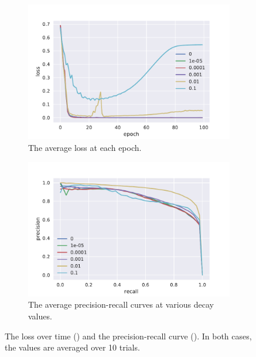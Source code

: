 \begin{figure}[htbp]
  \centering
  \begin{subfigure}[t]{0.49\textwidth}
    \centering
    \includegraphics[width=\textwidth]{./figures/results/decay/losses.pdf}
    \caption{The average loss at each epoch.\\}%
    \label{fig:decay_loss}
  \end{subfigure}
  \begin{subfigure}[t]{0.49\textwidth}
    \centering
    \includegraphics[width=\textwidth]{./figures/results/decay/pr.pdf}
    \caption{The average precision-recall curves at various decay values.}%
    \label{fig:decay_pr}
  \end{subfigure}
  \caption{The loss over time () and the
    precision-recall curve (). In both cases, the values are
    averaged over 10 trials.}%
    \label{fig:decay_plots}
\end{figure}

